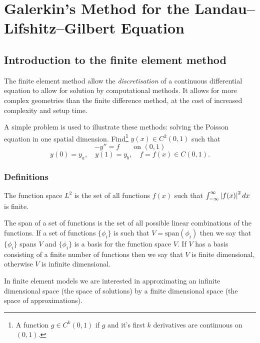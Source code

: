 \chapter{Galerkin's Method for the Landau--Lifshitz--Gilbert Equation}
\label{sec:galerk-meth-llg}

\section{Introduction to the finite element method}
\label{sec:intr-finite-ele-diff}

The finite element method allow the \emph{discretisation} of a continuous differential equation to allow for solution by computational methods. 
It allows for more complex geometries than the finite difference method, at the cost of increased complexity and setup time.

A simple problem is used to illustrate these methods: solving the Poisson
equation in one spatial dimension. Find\footnote{A function $g\in C^{k}(0,1)$ if $g$ and it's first $k$ derivatives are continuous on $(0,1)$.} $y(x)\in C^{2}(0,1)$ such that
\begin{equation}
  -y''=f\qquad\text{on }(0,1)
  \label{eq:poisson1}
\end{equation}
\begin{equation*}
  y(0)=y_{a},\quad y(1)=y_{b},\quad f=f(x)\in C(0,1).
\end{equation*}


\subsection{Definitions}
\label{sec:fem-definitions}

The function space $L^{2}$ is the set of all functions $f(x)$ such
that $\intop_{-\infty}^{\infty}\abs{f(x)}^{2}dx$ is finite.

The span of a set of functions is the set of all possible linear combinations of
the functions. If a set of functions $\{\phi_{i}\}$ is such that
$V=\text{span}(\phi_{i})$ then we say that $\{\phi_{i}\}$ spans $V$ and
$\{\phi_{i}\}$ is a basis for the function space $V$. If $V$ has a basis consisting of a finite number of functions then we say that $V$ is finite dimensional, otherwise $V$ is infinite dimensional.

In finite element models we are interested in approximating an infinite
dimensional space (the space of solutions) by a finite dimensional
space (the space of approximations).

